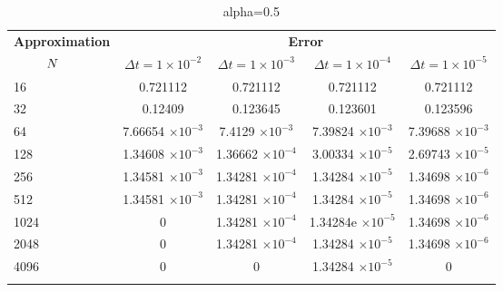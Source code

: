	\begin{table}
		\begin{tabular}{lcccc}
			\toprule
			\multicolumn{1}{c}{\textbf{Approximation}} & \multicolumn{4}{c}{\textbf{Error}} \\
			$\hspace{9mm}N$ & $\Delta t=1\times 10^{-2}$ & $\Delta t=1\times 10^{-3}$ & $\Delta t=1\times 10^{-4}$ & $\Delta t=1\times 10^{-5}$ \\
			\midrule
			\hspace{7mm} 16 & 0.721112   & 0.721112    & 0.721112    & 0.721112    \\
			\midrule
			\hspace{7mm} 32 & 0.12409    & 0.123645    & 0.123601    & 0.123596    \\
			\midrule
			\hspace{7mm} 64 & 7.66654 $\times 10^{-3}$ & 7.4129 $\times 10^{-3}$   & 7.39824 $\times 10^{-3}$  & 7.39688 $\times 10^{-3}$  \\
			\midrule
			\hspace{7mm} 128 & 1.34608 $\times 10^{-3}$ & 1.36662 $\times 10^{-4}$ & 3.00334 $\times 10^{-5}$ & 2.69743 $\times 10^{-5}$ \\
			\midrule
			\hspace{7mm} 256 & 1.34581 $\times 10^{-3}$ & 1.34281 $\times 10^{-4}$ & 1.34284 $\times 10^{-5}$ & 1.34698 $\times 10^{-6}$ \\
			\midrule
			\hspace{7mm} 512 & 1.34581 $\times 10^{-3}$ & 1.34281 $\times 10^{-4}$ & 1.34284 $\times 10^{-5}$ & 1.34698 $\times 10^{-6}$ \\
			\midrule
			\hspace{7mm} 1024 & 0          & 1.34281 $\times 10^{-4}$ & 1.34284e $\times 10^{-5}$ & 1.34698 $\times 10^{-6}$ \\
			\midrule
			\hspace{7mm} 2048 & 0          & 1.34281 $\times 10^{-4}$ & 1.34284 $\times 10^{-5}$ & 1.34698 $\times 10^{-6}$ \\
			\midrule
			\hspace{7mm} 4096 & 0          & 0           & 1.34284 $\times 10^{-5}$ & 0           \\
			\\
			\bottomrule
		\end{tabular}
		\caption{alpha=0.5}
	\end{table}	

